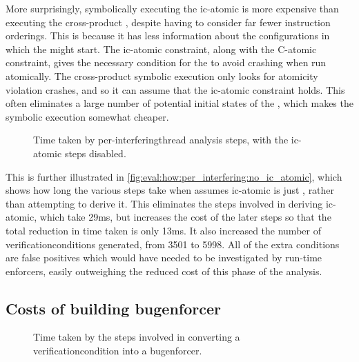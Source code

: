 More surprisingly, symbolically executing the \gls{ic-atomic}
{\StateMachine} is more expensive than executing the cross-product
{\StateMachine}, despite having to consider far fewer instruction
orderings.  This is because it has less information about the
configurations in which the {\StateMachines} might start.  The
\gls{ic-atomic} constraint, along with the C-atomic constraint, gives
the necessary condition for the {\StateMachines} to avoid crashing
when run atomically.  The cross-product symbolic execution only looks
for atomicity violation crashes, and so it can assume that the
\gls{ic-atomic} constraint holds.  This often eliminates a large
number of potential initial states of the {\StateMachines}, which
makes the symbolic execution somewhat cheaper.

\begin{figure}
  \centerline{
  }
  \caption{Time taken by per-\gls{interferingthread} analysis steps,
    with the \gls{ic-atomic} steps disabled.}
  \label{fig:eval:how:per_interfering:no_ic_atomic}
\end{figure}

This is further illustrated in
\autoref{fig:eval:how:per_interfering:no_ic_atomic}, which shows how
long the various steps take when {\technique} assumes \gls{ic-atomic}
is just \true, rather than attempting to derive it.  This eliminates
the steps involved in deriving \gls{ic-atomic}, which take 29ms, but
increases the cost of the later steps so that the total reduction in
time taken is only 13ms.  It also increased the number of
\glspl{verificationcondition} generated, from 3501 to 5998.  All of
the extra conditions are false positives which would have needed to be
investigated by run-time enforcers, easily outweighing the reduced
cost of this phase of the analysis.


\subsection{Costs of building \gls{bugenforcer}}

\begin{figure}
  \centerline{
  }
  \caption{Time taken by the steps involved in converting a
    \gls{verificationcondition} into a \gls{bugenforcer}.}
  \label{fig:eval:how:build_enforcer}
\end{figure}


